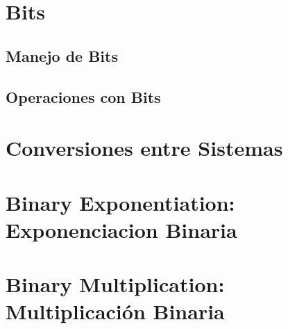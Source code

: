 \documentclass[12pt, fleqn]{report}                             %
\theoremstyle{break}                                            %
\begin{document}
        \section{Bits}

            \subsection{Manejo de Bits}

            \subsection{Operaciones con Bits}

        \section{Conversiones entre Sistemas}

        \section{Binary Exponentiation: Exponenciacion Binaria}

        \section{Binary Multiplication: Multiplicación Binaria}



    \clearpage
\end{document}
